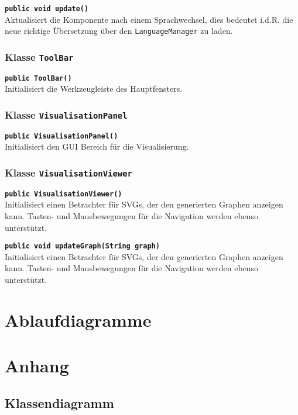 \documentclass[parskip=full,11pt,twoside]{scrartcl}
\begin{document}
\textbf{\texttt{public void update()}}\\
Aktualisiert die Komponente nach einem Sprachwechsel, dies bedeutet i.d.R. die neue richtige Übersetzung über den \texttt{LanguageManager} zu laden.

\subsubsection{Klasse \texttt{ToolBar}}

\textbf{\texttt{public ToolBar()}}\\
Initialisiert die Werkzeugleiste des Hauptfensters.

\subsubsection{Klasse \texttt{VisualisationPanel}}

\textbf{\texttt{public VisualisationPanel()}}\\
Initialisiert den GUI Bereich für die Visualisierung.

\subsubsection{Klasse \texttt{VisualisationViewer}}

\textbf{\texttt{public VisualisationViewer()}}\\
Initialisiert einen Betrachter für SVGs, der den generierten Graphen anzeigen kann. Tasten- und Mausbewegungen für die Navigation werden ebenso unterstützt.

\textbf{\texttt{public void updateGraph(String graph)}}\\
Initialisiert einen Betrachter für SVGs, der den generierten Graphen anzeigen kann. Tasten- und Mausbewegungen für die Navigation werden ebenso unterstützt.

\section{Ablaufdiagramme}

\appendix

\section{Anhang}

\subsection{Klassendiagramm}
\end{document}
